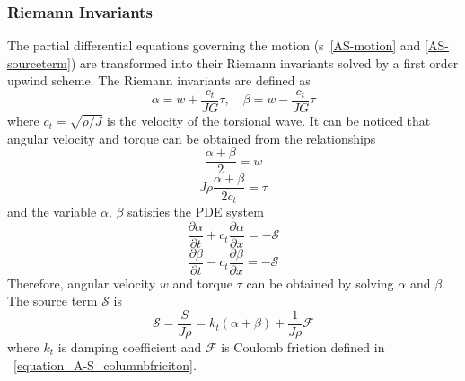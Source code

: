 \subsubsection{Riemann Invariants}
The partial differential equations governing the motion (\equationname{}s~\ref{AS-motion} and \ref{AS-sourceterm}) are transformed into their Riemann invariants solved by a first order upwind scheme. The Riemann invariants are defined as
\begin{equation}\label{AS-Riemann}
  \alpha = w + \frac{c_t}{JG}\tau, \quad \beta=w-\frac{c_t}{JG}\tau
\end{equation}
where $c_t = \sqrt{\rho/J}$ is the velocity of the torsional wave. It can be noticed that angular velocity and torque can be obtained from the relationships
\begin{equation}\label{equation_Riemann_relation1}
  \frac{\alpha + \beta}{2} = w
\end{equation}
\begin{equation}\label{equation_Riemann_relation2}
  J \rho \frac{\alpha + \beta}{2c_t} = \tau
\end{equation}
and the variable $\alpha$, $\beta$ satisfies the PDE system
\begin{equation}\label{AS-Riemann_alpha}
  \frac{\partial \alpha}{\partial t} + c_t\frac{\partial \alpha}{\partial x} = -\mathcal{S}
\end{equation}
\begin{equation}\label{AS-Riemann_beta}
  \frac{\partial \beta}{\partial t} - c_t\frac{\partial \beta}{\partial x} = -\mathcal{S}
\end{equation}
Therefore, angular velocity $w$ and torque $\tau$ can be obtained by solving $\alpha$ and $\beta$.
The source term $\mathcal{S}$ is
\begin{equation}\label{AS-source}
  \mathcal{S} = \frac{S}{J \rho} = k_t(\alpha + \beta) + \frac{1}{J \rho} \mathcal{F}
\end{equation} 
where $k_t$ is damping coefficient and $\mathcal{F}$ is Coulomb friction defined in \equationname~\ref{equation_A-S_columnbfriciton}.
